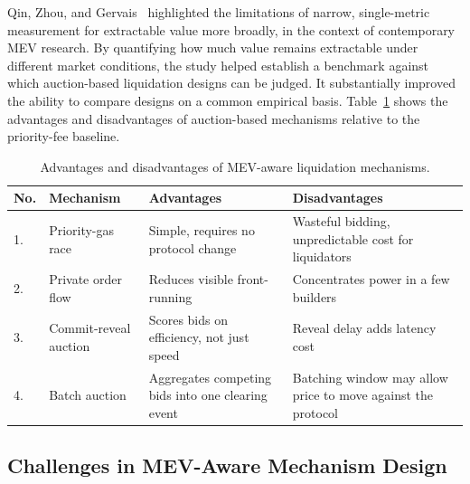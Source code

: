\documentclass{llncs}
\begin{document}
Qin, Zhou, and Gervais~\cite{qin2022quantifying} highlighted the
limitations of narrow, single-metric measurement for extractable value
more broadly, in the context of contemporary MEV research. By
quantifying how much value remains extractable under different market
conditions, the study helped establish a benchmark against which
auction-based liquidation designs can be judged. It substantially
improved the ability to compare designs on a common empirical basis.
Table~\ref{tab:comparison} shows the advantages and disadvantages of
auction-based mechanisms relative to the priority-fee baseline.

\begin{table}[h]
\caption{Advantages and disadvantages of MEV-aware liquidation mechanisms.}
\label{tab:comparison}
\centering
\renewcommand{\arraystretch}{1.2}
\begin{tabular}{p{0.9cm}p{2.3cm}p{4.3cm}p{4.3cm}}
\toprule
\textbf{No.} & \textbf{Mechanism} & \textbf{Advantages} & \textbf{Disadvantages} \\
\midrule
1. & Priority-gas race & Simple, requires no protocol change & Wasteful bidding, unpredictable cost for liquidators \\
2. & Private order flow & Reduces visible front-running & Concentrates power in a few builders \\
3. & Commit-reveal auction & Scores bids on efficiency, not just speed & Reveal delay adds latency cost \\
4. & Batch auction & Aggregates competing bids into one clearing event & Batching window may allow price to move against the protocol \\
\bottomrule
\end{tabular}
\end{table}

\subsection{Challenges in MEV-Aware Mechanism Design}
\end{document}
